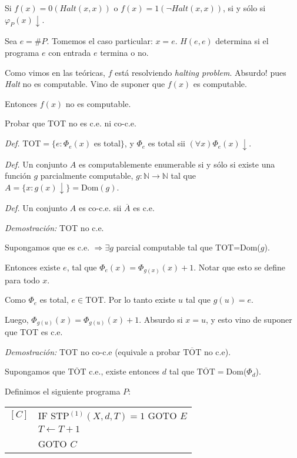 \begin{questions}
\begin{solution}
Si $f(x) = 0 (Halt(x,x))$ o $f(x) = 1 (\neg Halt(x,x))$, si y s\'olo si $\varphi_P(x)\downarrow$.

Sea $e = \#P$. Tomemos el caso particular: $x = e$. $H(e,e)$ determina si el programa $e$ con entrada $e$ termina o no. 

Como vimos en las te\'oricas, $f$ est\'a resolviendo {\it halting problem}. Absurdo! pues {\it Halt} no es computable. Vino de suponer que $f(x)$ es computable. 

Entonces $f(x)$ no es computable. 

\end{solution}

\question Probar que TOT no es c.e. ni co-c.e.

\begin{solution}

 {\it Def. } TOT$=\{ e : \Phi_e(x)$ es total$\}$, y $\Phi_e$ es total sii $(\forall x)\Phi_e(x)\downarrow$.
 
 {\it Def. } Un conjunto $A$ es computablemente enumerable si y s\'olo si existe una funci\'on $g$ parcialmente computable, $g: \mathbb{N} \rightarrow \mathbb{N}$ tal que $A = \{x : g(x)\downarrow \} = \text{Dom}(g)$.

 {\it Def. } Un conjunto $A$ es co-c.e. sii $\overline{A}$ es c.e.
 
 {\it Demostraci\'on: } TOT no c.e.
 
 Supongamos que es c.e. $\Rightarrow \exists g$ parcial computable tal que TOT=Dom($g$).
 
 Entonces existe $e$, tal que $\Phi_e(x)=\Phi_{g(x)}(x)+1$. Notar que esto se define para todo $x$. 
 
 Como $\Phi_e$ es total, $e\in$TOT. Por lo tanto existe $u$ tal que $g(u)=e$. 
 
 Luego, $\Phi_{g(u)}(x)=\Phi_{g(u)}(x)+1$. Absurdo si $x=u$, y esto vino de suponer que TOT es c.e.
 
 {\it Demostraci\'on: } TOT no co-c.e (equivale a probar $\overline{\text{TOT}}$ no c.e).
 
 Supongamos que $\overline{\text{TOT}}$ c.e., existe entonces $d$ tal que $\overline{\text{TOT}}=$Dom($\Phi_d$). 
 
 Definimos el siguiente programa $P$: 
 
 \vspace{0.5cm}
  \begin{tabular}{rl}
    $[C]$ & IF STP$^{(1)}(X,d,T)=1$ GOTO $E$ \\
	  & $T\leftarrow T+1$\\
	  & GOTO $C$
  \end{tabular}
 \vspace{0.5cm}
 

\end{solution}
\end{questions}
